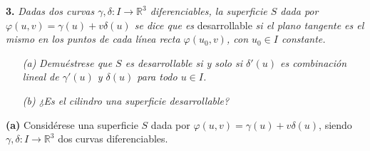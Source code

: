 \documentclass[12pt]{report}
\newcommand{\R}{\mathbb R}
\begin{document}
\vspace{4mm}
\textbf{3. } \textit{Dadas dos curvas $\gamma, \delta \colon I \to \R^3$ diferenciables, la superficie $S$ dada por $\varphi(u,v) = \gamma(u)+v\delta(u)$ se dice que es} desarrollable \textit{si el plano tangente es el mismo en los puntos de cada línea recta $\varphi(u_0,v)$, con  $u_0 \in I$ constante.}
\begin{itemize}
    \item[\textit{(a)}] \textit{Demuéstrese que $S$ es desarrollable si y solo si $\delta'(u)$ es combinación lineal de $\gamma'(u)$ y $\delta(u)$ para todo $u \in I$.}
    \item[\textit{(b)}] \textit{¿Es el cilindro una superficie desarrollable?}
\end{itemize}

\vspace{2mm}
\textbf{(a)} Considérese una superficie $S$ dada por $\varphi(u,v) = \gamma(u)+v\delta(u)$, siendo $\gamma,\delta \colon I \to \R^3$ dos curvas diferenciables.
\end{document}
